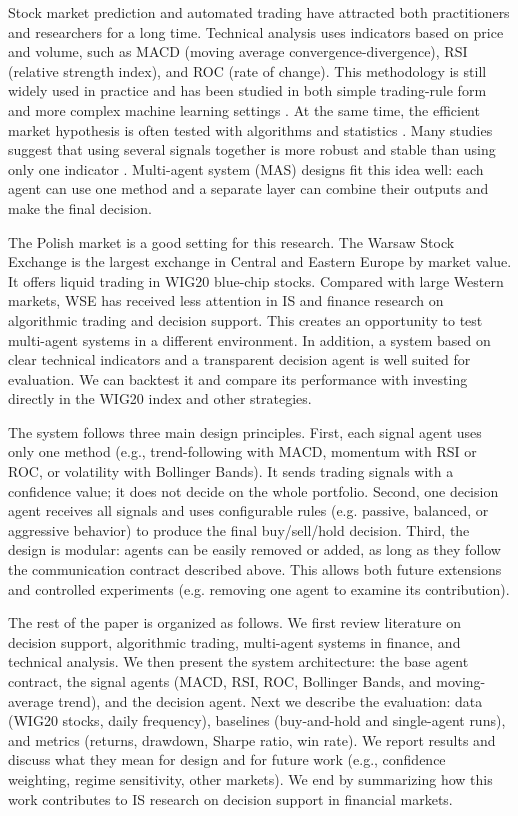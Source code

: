 \documentclass{icis}
\begin{document}
Stock market prediction and automated trading have attracted both practitioners and researchers for a long time. Technical analysis uses indicators based on price and volume, such as MACD (moving average convergence-divergence), RSI (relative strength index), and ROC (rate of change). This methodology is still widely used in practice and has been studied in both simple trading-rule form and more complex machine learning settings \autocite{brock1992,gerlein2016}. At the same time, the efficient market hypothesis is often tested with algorithms and statistics \autocite{boboc2013}. Many studies suggest that using several signals together is more robust and stable than using only one indicator \autocite{korczak2013,hernes2016}. Multi-agent system (MAS) designs fit this idea well: each agent can use one method and a separate layer can combine their outputs and make the final decision.

The Polish market is a good setting for this research. The Warsaw Stock Exchange is the largest exchange in Central and Eastern Europe by market value. It offers liquid trading in WIG20 blue-chip stocks. Compared with large Western markets, WSE has received less attention in IS and finance research on algorithmic trading and decision support. This creates an opportunity to test multi-agent systems in a different environment. In addition, a system based on clear technical indicators and a transparent decision agent is well suited for evaluation. We can backtest it and compare its performance with investing directly in the WIG20 index and other strategies.

The system follows three main design principles. First, each signal agent uses only one method (e.g., trend-following with MACD, momentum with RSI or ROC, or volatility with Bollinger Bands). It sends trading signals with a confidence value; it does not decide on the whole portfolio. Second, one decision agent receives all signals and uses configurable rules (e.g. passive, balanced, or aggressive behavior) to produce the final buy/sell/hold decision. Third, the design is modular: agents can be easily removed or added, as long as they follow the communication contract described above. This allows both future extensions and controlled experiments (e.g. removing one agent to examine its contribution).

The rest of the paper is organized as follows. We first review literature on decision support, algorithmic trading, multi-agent systems in finance, and technical analysis. We then present the system architecture: the base agent contract, the signal agents (MACD, RSI, ROC, Bollinger Bands, and moving-average trend), and the decision agent. Next we describe the evaluation: data (WIG20 stocks, daily frequency), baselines (buy-and-hold and single-agent runs), and metrics (returns, drawdown, Sharpe ratio, win rate). We report results and discuss what they mean for design and for future work (e.g., confidence weighting, regime sensitivity, other markets). We end by summarizing how this work contributes to IS research on decision support in financial markets.
\end{document}
